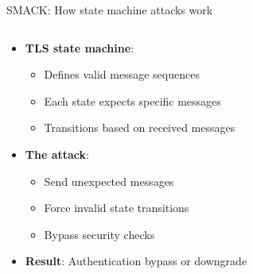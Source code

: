 \documentclass[aspectratio=169, lualatex, handout]{beamer}
\begin{document}
\begin{frame}{SMACK: How state machine attacks work}
	\begin{columns}[c]
		\begin{column}{0.5\textwidth}
			\begin{itemize}
				\item \textbf{TLS state machine}:
				      \begin{itemize}
					      \item Defines valid message sequences
					      \item Each state expects specific messages
					      \item Transitions based on received messages
				      \end{itemize}
				\item \textbf{The attack}:
				      \begin{itemize}
					      \item Send unexpected messages
					      \item Force invalid state transitions
					      \item Bypass security checks
				      \end{itemize}
				\item \textbf{Result}: Authentication bypass or downgrade
			\end{itemize}
		\end{column}
		\begin{column}{0.5\textwidth}
		\end{column}
	\end{columns}
\end{frame}
\end{document}
